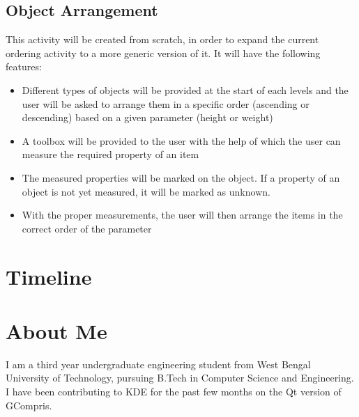 \documentclass[preprint,12pt]{elsarticle}
\begin{document}
\subsection{Object Arrangement}

This activity will be created from scratch, in order to expand the current ordering activity to a more generic version of it. It will have the following features:

\begin{itemize}

\item Different types of objects will be provided at the start of each levels and the user will be asked to arrange them in a specific order (ascending or descending) based on a given parameter (height or weight)

\item A toolbox will be provided to the user with the help of which the user can measure the required property of an item

\item The measured properties will be marked on the object. If a property of an object is not yet measured, it will be marked as unknown.

\item With the proper measurements, the user will then arrange the items in the correct order of the parameter

\end{itemize}





\section{Timeline}
\label{S:1}

\section{About Me}
\label{S:1}

I am a third year undergraduate engineering student from West Bengal University of Technology, pursuing B.Tech in Computer Science and Engineering. I have been contributing to KDE for the past few months on the Qt version of GCompris.
\end{document}
